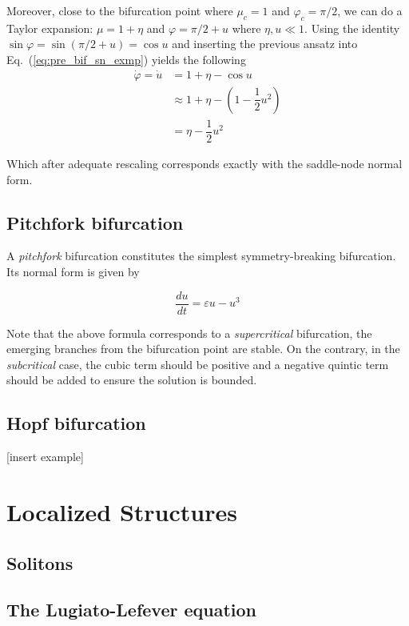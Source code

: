 \begin{exmp}
    Moreover, close to the bifurcation point where $\mu_c = 1$ and $\varphi_c = \pi/2$,
    we can do a Taylor expansion: $\mu = 1 + \eta$ and $\varphi = \pi/2 + u$ 
    where $\eta, u \ll 1$. Using the identity $\sin \varphi = \sin (\pi/2 + u) = \cos u$
    and inserting the previous ansatz into Eq.~(\ref{eq:pre_bif_sn_exmp}) yields
    the following
    \begin{align*}
        \dot{\varphi} = \dot{u} &= 1 + \eta - \cos u \\ 
        &\approx 1 + \eta - (1 - \dfrac12 u^2) \\
        &= \eta - \dfrac12 u^2
    \end{align*}

    Which after adequate rescaling corresponds exactly with the saddle-node
    normal form.
    

\end{exmp}

\subsection{Pitchfork bifurcation}

A {\em pitchfork} bifurcation constitutes the simplest symmetry-breaking bifurcation.
Its normal form is given by

\begin{equation}
    \dfrac{du}{dt} = \varepsilon u - u ^ 3
\end{equation}

Note that the above formula corresponds to a {\em supercritical} bifurcation, the emerging branches from the
bifurcation point are stable. On the contrary, in the {\em subcritical} case, the cubic
term should be positive and a negative quintic term should be added to ensure the solution is bounded.
\subsection{Hopf bifurcation}

[insert example]

\section{Localized Structures}
\label{sec:fra_LS}

\subsection{Solitons}
\subsection{The Lugiato-Lefever equation}

